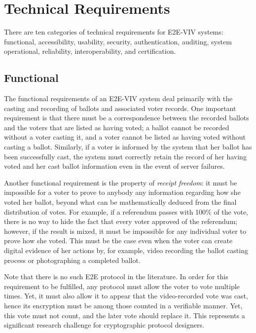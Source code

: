 \section{Technical Requirements}
There are ten categories of technical requirements for E2E-VIV
systems: functional, accessibility, usability, security,
authentication, auditing, system operational, reliability,
interoperability, and certification. 

\subsection{Functional} 
\label{sec:functional}

The functional requirements of an E2E-VIV system deal primarily with
the casting and recording of ballots and associated voter records. One
important requirement is that there must be a correspondence between
the recorded ballots and the voters that are listed as having voted; a
ballot cannot be recorded without a voter casting it, and a voter
cannot be listed as having voted without casting a ballot. Similarly,
if a voter is informed by the system that her ballot has been
successfully cast, the system must correctly retain the record of her
having voted and her cast ballot information even in the event of
server failures.

Another functional requirement is the property of \emph{receipt
  freedom}: it must be impossible for a voter to prove to anybody any
information regarding how she voted her ballot, beyond what can be
mathematically deduced from the final distribution of votes. For
example, if a referendum passes with 100\% of the vote, there is no
way to hide the fact that every voter approved of the referendum;
however, if the result is mixed, it must be impossible for any
individual voter to prove how she voted.  This must be the case even
when the voter can create digital evidence of her actions by, for
example, video recording the ballot casting process or photographing a
completed ballot.

Note that there is no such E2E protocol in the literature. In order
for this requirement to be fulfilled, any protocol must allow the
voter to vote multiple times.  Yet, it must also allow it to appear
that the video-recorded vote was cast, hence its encryption must be
among those counted in a verifiable manner. Yet, this vote must not
count, and the later vote should replace it. This represents a
significant research challenge for cryptographic protocol designers.

